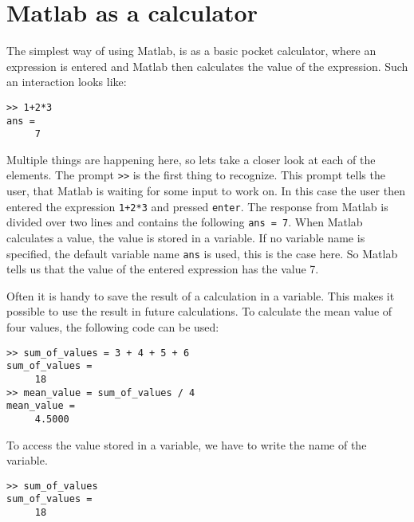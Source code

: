 \section{Matlab as a calculator}

\newcommand{\known}[1]{\todo[inline, color=green!20, nolist]{New commands: \texttt{#1}}}

The simplest way of using Matlab, is as a basic pocket calculator, where an
expression is entered and Matlab then calculates the value of the expression.
Such an interaction looks like:
\begin{verbatim}
>> 1+2*3
ans =
     7
\end{verbatim}
Multiple things are happening here, so lets take a closer look at each of the
elements.
The prompt \verb!>>! is the first thing to recognize.
This prompt tells the user, that Matlab is waiting for some input to work on.
In this case the user then entered the expression \verb!1+2*3! and pressed 
\verb!enter!.
The response from Matlab is divided over two lines and contains the following 
\verb!ans = 7!.
When Matlab calculates a value, the value is stored in a variable.
If no variable name is specified, the default variable name \verb!ans! is used, 
this is the case here.
So Matlab tells us that the value of the entered expression has the value 7.

Often it is handy to save the result of a calculation in a variable.
This makes it possible to use the result in future calculations.
To calculate the mean value of four values, the following code can be used:
\begin{verbatim}
>> sum_of_values = 3 + 4 + 5 + 6
sum_of_values = 
     18
>> mean_value = sum_of_values / 4
mean_value =
     4.5000
\end{verbatim}
To access the value stored in a variable, we have to write the name of the variable.
\begin{verbatim}
>> sum_of_values
sum_of_values = 
     18
\end{verbatim}




